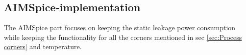 \subsection{AIMSpice-implementation}
The AIMSpice part focuses on keeping the static leakage power consumption while keeping the functionality for all the corners mentioned in sec \ref{sec:Process corners} and temperature.